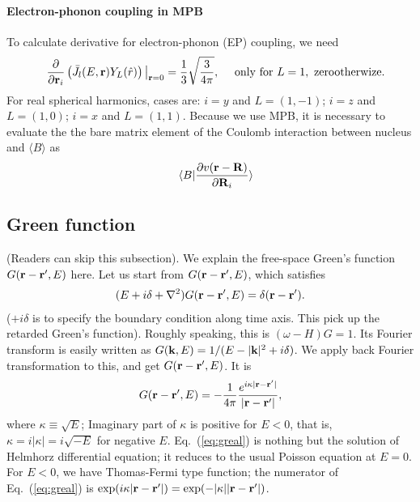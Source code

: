 \documentclass[a4paper,10pt,fleqn]{article}
\newcommand{\bfk}{{\bf k}}
\newcommand{\bfr}{{\bf r}}
\newcommand{\bfR}{{\bf R}}
\newcommand{\req}[1]{\mbox{Eq.~(\ref{#1})}}
\begin{document}
\paragraph{Electron-phonon coupling in MPB}
To calculate derivative for electron-phonon (EP) coupling, we need
\begin{eqnarray}
&&\frac{\partial}{\partial \bfr_i} \left(\bar{J}_l(E,\bfr)
				    Y_L(\hat{r})\right)\big|_{\bfr=0}=
\frac{1}{3} \sqrt{\frac{3}{4\pi}}, \ \ \ \ {\rm only \ for} \ L=1,\ {\rm zero otherwize}.
\end{eqnarray}
For real spherical harmonics, cases are: 
$i=y$ and $L=(1,-1)$; $i=z$ and $L=(1,0)$; $i=x$ and $L=(1,1)$.
Because we use MPB, it is necessary to evaluate the 
the bare matrix element of the Coulomb interaction between nucleus and 
$\langle B\rangle$ as
\begin{eqnarray}
&&\langle B|\frac{\partial v(\bfr-\bfR)}{\partial \bfR_i}\rangle
\end{eqnarray}

 
\subsection{Green function}
(Readers can skip this subsection).
We explain the free-space Green's function
$G(\bfr-\bfr',E)$ here.
Let us start from $G(\bfr-\bfr',E)$, which satisfies
\begin{eqnarray}
(E+i\delta+\nabla^2)G(\bfr-\bfr',E)=\delta(\bfr-\bfr').
\label{eq:diffg}
\end{eqnarray}
($+i\delta$ is to specify the boundary condition along time axis. This pick up the retarded Green's function).
Roughly speaking, this is $(\omega -H) G=1$.
Its Fourier transform is easily written as
$G(\bfk,E)=1/(E-|\bfk|^2+ i \delta)$.
We apply back Fourier transformation to this, and get $G(\bfr-\bfr',E)$.
It is
\begin{eqnarray}
G(\bfr-\bfr',E)=-\frac{1}{4 \pi} 
\frac{e^{i \kappa|\bfr-\bfr'|}}{|\bfr-\bfr'|}, \label{eq:greal}
\end{eqnarray}
where $\kappa \equiv \sqrt{E}$; Imaginary part of $\kappa$ is positive
for $E<0$, that is, $\kappa = i |\kappa|= i \sqrt{-E}$ for negative $E$.
\req{eq:greal} is nothing but the solution of Helmhorz 
differential equation; it reduces to the usual Poisson equation at
$E=0$. For $E<0$, we have Thomas-Fermi type function;
the numerator of \req{eq:greal} is $\exp(i \kappa |\bfr-\bfr'|)=\exp(- |\kappa| |\bfr-\bfr'|)$.
\end{document}
